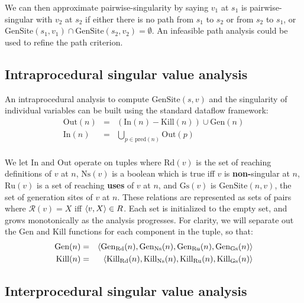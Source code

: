 \documentclass[11pt,notitlepage]{article}
\begin{document}
We can then approximate pairwise-singularity by saying $v_1$ at $s_1$
is pairwise-singular with $v_2$ at $s_2$ if either
there is no path from $s_1$ to $s_2$ or from $s_2$ to $s_1$, or
$\text{GenSite}(s_1,v_1) \cap \text{GenSite}(s_2,v_2) = \emptyset $.
An infeasible path analysis \cite{267921} could be used to refine
the path criterion.

\subsection{Intraprocedural singular value analysis}

An intraprocedural analysis to compute $\text{GenSite}(s, v)$ and the
singularity of individual variables can be built using the standard
dataflow framework:
\begin{eqnarray*}
\text{Out}(n)&=&\left(\text{In}(n)-\text{Kill}(n)\right)\cup\text{Gen}(n) \\
\text{In}(n)&=&\bigcup_{p\in\text{pred}(n)} \text{Out}(p)\\
\end{eqnarray*}

We let $\text{In}$ and $\text{Out}$ operate on tuples 
 where $\text{Rd}(v)$ is the set
of reaching definitions of $v$ at $n$, $\text{Ns}(v)$ is a boolean
which is true iff $v$ is \textbf{non-}singular at $n$, $\text{Ru}(v)$
is a set of reaching \textbf{uses} of $v$ at $n$, and $\text{Gs}(v)$
is $\text{GenSite}(n, v)$, the set of generation sites of $v$ at $n$.
These relations are represented as sets of pairs  where
$\mathcal{R}(v)=X$ iff $\left\langle v,X \right\rangle \in R$.  Each set is initialized
to the empty set, and grows monotonically as the analysis
progresses.  For clarity, we will separate out the Gen and Kill
functions for each component in the tuple, so that:
\begin{eqnarray*}
\text{Gen}(n) &=& \left\langle \text{Gen}_\text{Rd}(n),
                       \text{Gen}_\text{Ns}(n),
                       \text{Gen}_\text{Ru}(n),
                       \text{Gen}_\text{Gs}(n) \right\rangle \\
\text{Kill}(n) &=& \left\langle \text{Kill}_\text{Rd}(n),
                       \text{Kill}_\text{Ns}(n),
                       \text{Kill}_\text{Ru}(n),
                       \text{Kill}_\text{Gs}(n) \right\rangle \\
\end{eqnarray*}


\subsection{Interprocedural singular value analysis}
\end{document}
